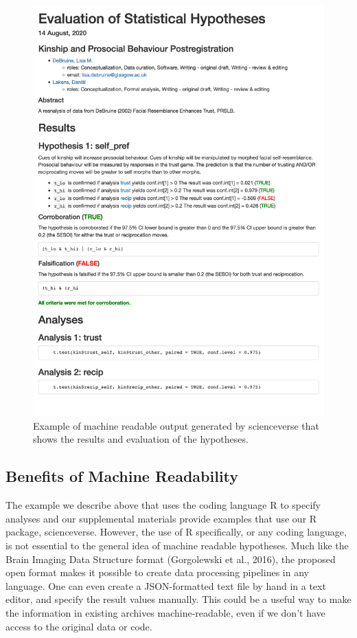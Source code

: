 \documentclass[
  english,
  doc,floatsintext]{apa6}
\begin{document}
\begin{figure}[htbp]
\centering
\includegraphics{images/output.png}
\caption{Example of machine readable output generated by scienceverse that shows the results and evaluation of the hypotheses. \label{fig1}}
\end{figure}

\hypertarget{benefits-of-machine-readability}{%
\subsection{Benefits of Machine Readability}\label{benefits-of-machine-readability}}

The example we describe above that uses the coding language R to specify analyses and our supplemental materials provide examples that use our R package, scienceverse. However, the use of R specifically, or any coding language, is not essential to the general idea of machine readable hypotheses. Much like the Brain Imaging Data Structure format (Gorgolewski et al., 2016), the proposed open format makes it possible to create data processing pipelines in any language. One can even create a JSON-formatted text file by hand in a text editor, and specify the result values manually. This could be a useful way to make the information in existing archives machine-readable, even if we don't have access to the original data or code.
\end{document}
